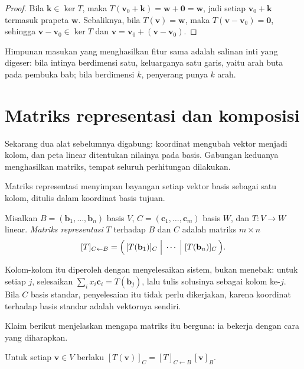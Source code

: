 \begin{proof}
Bila $\mathbf{k}\in\ker T$, maka $T(\mathbf{v}_{0}+\mathbf{k})=\mathbf{w}+\mathbf{0}=\mathbf{w}$,
jadi setiap $\mathbf{v}_{0}+\mathbf{k}$ termasuk prapeta $\mathbf{w}$. Sebaliknya, bila
$T(\mathbf{v})=\mathbf{w}$, maka $T(\mathbf{v}-\mathbf{v}_{0})=\mathbf{0}$, sehingga
$\mathbf{v}-\mathbf{v}_{0}\in\ker T$ dan $\mathbf{v}=\mathbf{v}_{0}+(\mathbf{v}-\mathbf{v}_{0})$.
\end{proof}

Himpunan masukan yang menghasilkan fitur sama adalah salinan inti yang digeser: bila intinya
berdimensi satu, keluarganya satu garis, yaitu arah buta pada pembuka bab; bila berdimensi
$k$,
penyerang punya $k$ arah.

\section{Matriks representasi dan komposisi}

Sekarang dua alat sebelumnya digabung: koordinat mengubah vektor menjadi kolom, dan peta
linear ditentukan nilainya pada basis. Gabungan keduanya menghasilkan matriks, tempat
seluruh
perhitungan dilakukan.

Matriks representasi menyimpan bayangan setiap vektor basis sebagai satu kolom, ditulis
dalam koordinat basis tujuan.

\begin{definisi}
Misalkan $B=(\mathbf{b}_{1},\dots,\mathbf{b}_{n})$ basis $V$,
$C=(\mathbf{c}_{1},\dots,\mathbf{c}_{m})$ basis $W$, dan $T\colon V\to W$ linear.
\emph{Matriks representasi} $T$ terhadap $B$ dan $C$ adalah matriks $m\times n$
\[
[T]_{C\leftarrow
B}=\Bigl(\,[T(\mathbf{b}_{1})]_{C}\;\Big|\;\cdots\;\Big|\;[T(\mathbf{b}_{n})]_{C}\,\Bigr).
\]
\end{definisi}

Kolom-kolom itu diperoleh dengan menyelesaikan sistem, bukan menebak: untuk setiap $j$,
selesaikan $\sum_{i}x_{i}\mathbf{c}_{i}=T(\mathbf{b}_{j})$, lalu tulis solusinya sebagai
kolom
ke-$j$. Bila $C$ basis standar, penyelesaian itu tidak perlu dikerjakan, karena koordinat
terhadap basis standar adalah vektornya sendiri.

Klaim berikut menjelaskan mengapa matriks itu berguna: ia bekerja dengan cara yang
diharapkan.

\begin{teorema}
Untuk setiap $\mathbf{v}\in V$ berlaku
$[T(\mathbf{v})]_{C}=[T]_{C\leftarrow B}\,[\mathbf{v}]_{B}$.
\end{teorema}

